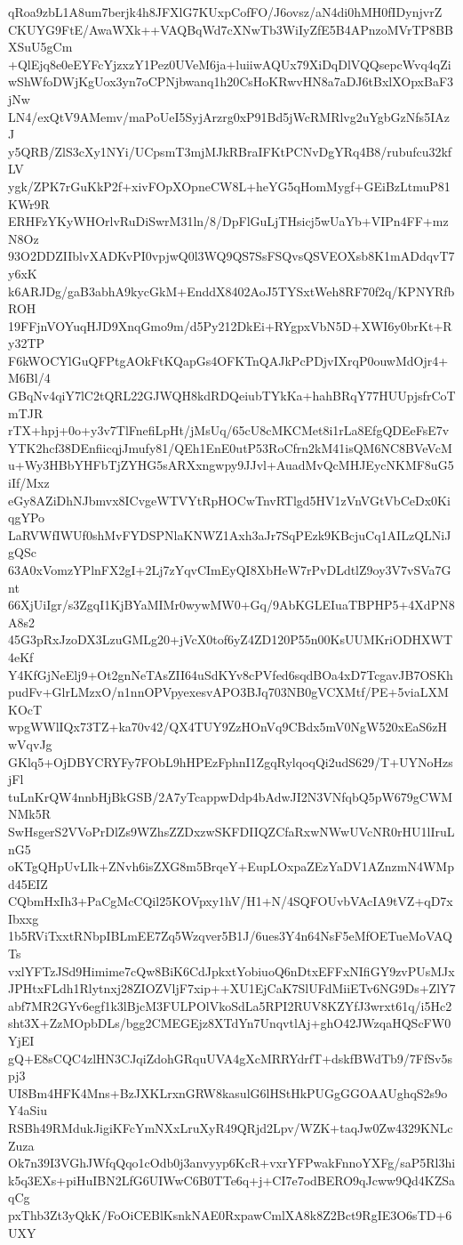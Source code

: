 qRoa9zbL1A8um7berjk4h8JFXlG7KUxpCofFO/J6ovsz/aN4di0hMH0fIDynjvrZ
CKUYG9FtE/AwaWXk++VAQBqWd7cXNwTb3WiIyZfE5B4APnzoMVrTP8BBXSuU5gCm
+QlEjq8e0eEYFcYjzxzY1Pez0UVeM6ja+luiiwAQUx79XiDqDlVQQsepcWvq4qZi
wShWfoDWjKgUox3yn7oCPNjbwanq1h20CsHoKRwvHN8a7aDJ6tBxlXOpxBaF3jNw
LN4/exQtV9AMemv/maPoUeI5SyjArzrg0xP91Bd5jWcRMRlvg2uYgbGzNfs5IAzJ
y5QRB/ZlS3cXy1NYi/UCpsmT3mjMJkRBraIFKtPCNvDgYRq4B8/rubufcu32kfLV
ygk/ZPK7rGuKkP2f+xivFOpXOpneCW8L+heYG5qHomMygf+GEiBzLtmuP81KWr9R
ERHFzYKyWHOrlvRuDiSwrM31ln/8/DpFlGuLjTHsicj5wUaYb+VIPn4FF+mzN8Oz
93O2DDZIIblvXADKvPI0vpjwQ0l3WQ9QS7SsFSQvsQSVEOXsb8K1mADdqvT7y6xK
k6ARJDg/gaB3abhA9kycGkM+EnddX8402AoJ5TYSxtWeh8RF70f2q/KPNYRfbROH
19FFjnVOYuqHJD9XnqGmo9m/d5Py212DkEi+RYgpxVbN5D+XWI6y0brKt+Ry32TP
F6kWOCYlGuQFPtgAOkFtKQapGs4OFKTnQAJkPcPDjvIXrqP0ouwMdOjr4+M6Bl/4
GBqNv4qiY7lC2tQRL22GJWQH8kdRDQeiubTYkKa+hahBRqY77HUUpjsfrCoTmTJR
rTX+hpj+0o+y3v7TlFnefiLpHt/jMsUq/65cU8cMKCMet8i1rLa8EfgQDEeFsE7v
YTK2hcf38DEnfiicqjJmufy81/QEh1EnE0utP53RoCfrn2kM41isQM6NC8BVeVcM
u+Wy3HBbYHFbTjZYHG5sARXxngwpy9JJvl+AuadMvQcMHJEycNKMF8uG5iIf/Mxz
eGy8AZiDhNJbmvx8ICvgeWTVYtRpHOCwTnvRTlgd5HV1zVnVGtVbCeDx0KiqgYPo
LaRVWfIWUf0shMvFYDSPNlaKNWZ1Axh3aJr7SqPEzk9KBcjuCq1AILzQLNiJgQSc
63A0xVomzYPlnFX2gI+2Lj7zYqvCImEyQI8XbHeW7rPvDLdtlZ9oy3V7vSVa7Gnt
66XjUiIgr/s3ZgqI1KjBYaMIMr0wywMW0+Gq/9AbKGLEIuaTBPHP5+4XdPN8A8s2
45G3pRxJzoDX3LzuGMLg20+jVcX0tof6yZ4ZD120P55n00KsUUMKriODHXWT4eKf
Y4KfGjNeElj9+Ot2gnNeTAsZII64uSdKYv8cPVfed6sqdBOa4xD7TcgavJB7OSKh
pudFv+GlrLMzxO/n1nnOPVpyexesvAPO3BJq703NB0gVCXMtf/PE+5viaLXMKOcT
wpgWWlIQx73TZ+ka70v42/QX4TUY9ZzHOnVq9CBdx5mV0NgW520xEaS6zHwVqvJg
GKlq5+OjDBYCRYFy7FObL9hHPEzFphnI1ZgqRylqoqQi2udS629/T+UYNoHzsjFl
tuLnKrQW4nnbHjBkGSB/2A7yTcappwDdp4bAdwJI2N3VNfqbQ5pW679gCWMNMk5R
SwHsgerS2VVoPrDlZs9WZhsZZDxzwSKFDIIQZCfaRxwNWwUVcNR0rHU1lIruLnG5
oKTgQHpUvLIk+ZNvh6isZXG8m5BrqeY+EupLOxpaZEzYaDV1AZnzmN4WMpd45EIZ
CQbmHxIh3+PaCgMcCQil25KOVpxy1hV/H1+N/4SQFOUvbVAcIA9tVZ+qD7xIbxxg
1b5RViTxxtRNbpIBLmEE7Zq5Wzqver5B1J/6ues3Y4n64NsF5eMfOETueMoVAQTs
vxlYFTzJSd9Himime7cQw8BiK6CdJpkxtYobiuoQ6nDtxEFFxNIfiGY9zvPUsMJx
JPHtxFLdh1Rlytnxj28ZIOZVljF7xip++XU1EjCaK7SlUFdMiiETv6NG9Ds+ZlY7
abf7MR2GYv6egf1k3lBjcM3FULPOlVkoSdLa5RPI2RUV8KZYfJ3wrxt61q/i5Hc2
sht3X+ZzMOpbDLs/bgg2CMEGEjz8XTdYn7UnqvtlAj+ghO42JWzqaHQScFW0YjEI
gQ+E8sCQC4zlHN3CJqiZdohGRquUVA4gXcMRRYdrfT+dskfBWdTb9/7FfSv5spj3
UI8Bm4HFK4Mns+BzJXKLrxnGRW8kasulG6lHStHkPUGgGGOAAUghqS2s9oY4aSiu
RSBh49RMdukJigiKFcYmNXxLruXyR49QRjd2Lpv/WZK+taqJw0Zw4329KNLcZuza
Ok7n39I3VGhJWfqQqo1cOdb0j3anvyyp6KcR+vxrYFPwakFnnoYXFg/saP5Rl3hi
k5q3EXs+piHuIBN2LfG6UIWwC6B0TTe6q+j+CI7e7odBERO9qJcww9Qd4KZSaqCg
pxThb3Zt3yQkK/FoOiCEBlKsnkNAE0RxpawCmlXA8k8Z2Bct9RgIE3O6sTD+6UXY

